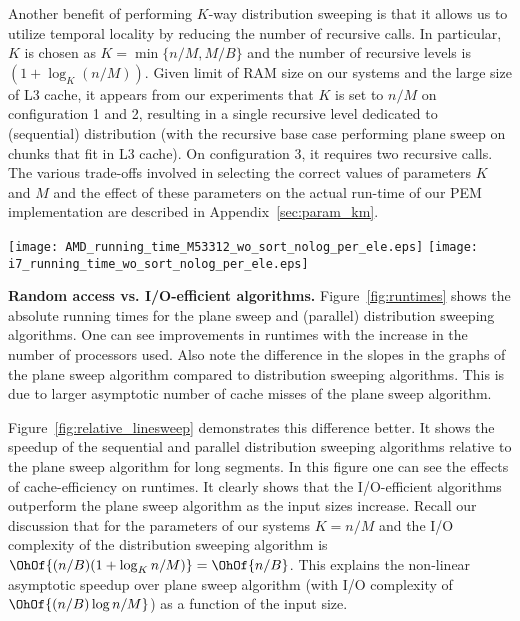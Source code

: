Another benefit of performing $K$-way distribution sweeping is that it
allows us to utilize temporal locality by reducing the number of
recursive calls. In particular, $K$ is chosen as $K = \min \{n/M, M/B\}$ and
the number of recursive levels is $(1+\log_{K} (n/M))$. Given limit of RAM size
on our systems and the large size of L3 cache, it appears from our experiments
that $K$ is set to $n/M$ on configuration 1 and 2, resulting in a single recursive level
dedicated to (sequential) distribution (with the recursive base case performing
plane sweep on chunks that fit in L3 cache). On configuration 3, it
requires two recursive calls. The various trade-offs involved in
selecting the correct values of parameters $K$ and $M$ and the effect
of these parameters on the actual run-time of our PEM implementation
are described in Appendix~\ref{sec:param_km}.

\begin{figure*}[tb]
\center
\texttt{[image: AMD\_running\_time\_M53312\_wo\_sort\_nolog\_per\_ele.eps]}
\hspace{1cm}
\texttt{[image: i7\_running\_time\_wo\_sort\_nolog\_per\_ele.eps]}
\caption{Runtimes on the configuration~\ref{item:amd} (left) and
  configuration~\ref{item:intel} (right) per element. The plots exclude the times to perform initial
sorting of inputs by the $y$-coordinate for distribution sweeping and
$x$-coordinate for the plane sweep.}
\label{fig:runtimes}
\end{figure*}

\textbf{Random access vs. I/O-efficient algorithms.} 
 Figure~\ref{fig:runtimes} shows the absolute running times for the plane sweep
and (parallel) distribution sweeping algorithms. One can see improvements in
runtimes with the increase in the number of processors used. Also note the
difference in the slopes in the graphs of the plane sweep algorithm compared to
distribution sweeping algorithms. This is due to larger asymptotic number of
cache misses of the plane sweep algorithm. 

Figure~\ref{fig:relative_linesweep} demonstrates this difference better. It
shows the speedup of the sequential and parallel distribution sweeping
algorithms relative to the plane sweep algorithm for long segments. In this
figure one can see the effects of cache-efficiency on runtimes.  It clearly
shows that the I/O-efficient algorithms outperform the plane sweep algorithm as
the input sizes increase. Recall our discussion that for the parameters of our
systems $K = n/M$ and the I/O complexity of the distribution sweeping algorithm
is $\OhOf{(n/B)(1+\log_K{n/M})} = \OhOf{n/B}$. This explains the non-linear
asymptotic speedup over plane sweep algorithm (with I/O complexity of
$\OhOf{(n/B) \log n/M}$) as a function of the input size.

